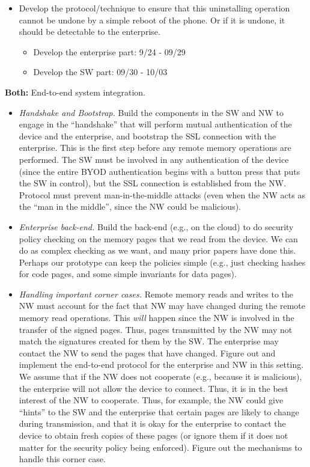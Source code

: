 \begin{mylist}
\begin{itemize}
%
\item Develop the protocol/technique to ensure that this uninstalling operation
cannot be undone by a simple reboot of the phone. Or if it is undone, it should
be detectable to the enterprise.
\begin{itemize}
 \item Develop the enterprise part: 9/24 - 09/29
 \item Develop the SW part: 09/30 - 10/03
\end{itemize}

%
\end{itemize}

\item{\bf Both:} End-to-end system integration.
%
\begin{itemize}
%
\item \textit{Handshake and Bootstrap.} Build the components in the SW and NW
to engage in the ``handshake'' that will perform mutual authentication of the
device and the enterprise, and bootstrap the SSL connection with the
enterprise. This is the first step before any remote memory operations are
performed. The SW must be involved in any authentication of the device (since
the entire BYOD authentication begins with a button press that puts the SW in
control), but the SSL connection is established from the NW. Protocol must
prevent man-in-the-middle attacks (even when the NW acts as the ``man in the
middle'', since the NW could be malicious).
%
\item \textit{Enterprise back-end.} Build the back-end (e.g., on the cloud) to
do security policy checking on the memory pages that we read from the device.
We can do as complex checking as we want, and many prior papers have done this.
Perhaps our prototype can keep the policies simple (e.g., just checking hashes
for code pages, and some simple invariants for data pages).
%
\item \textit{Handling important corner cases.} Remote memory reads and writes
to the NW must account for the fact that NW may have changed during the remote
memory read operations. This \textit{will} happen since the NW is involved in
the transfer of the signed pages. Thus, pages transmitted by the NW may not
match the signatures created for them by the SW.  The enterprise may contact
the NW to send the pages that have changed. Figure out and implement the
end-to-end protocol for the enterprise and NW in this setting. We assume that
if the NW does not cooperate (e.g., because it is malicious), the enterprise
will not allow the device to connect. Thus, it is in the best interest of the
NW to cooperate. Thus, for example, the NW could give ``hints'' to the SW and
the enterprise that certain pages are likely to change during transmission, and
that it is okay for the enterprise to contact the device to obtain fresh copies
of these pages (or ignore them if it does not matter for the security policy
being enforced). Figure out the mechanisms to handle this corner case.
%
\end{itemize}


\end{mylist}

